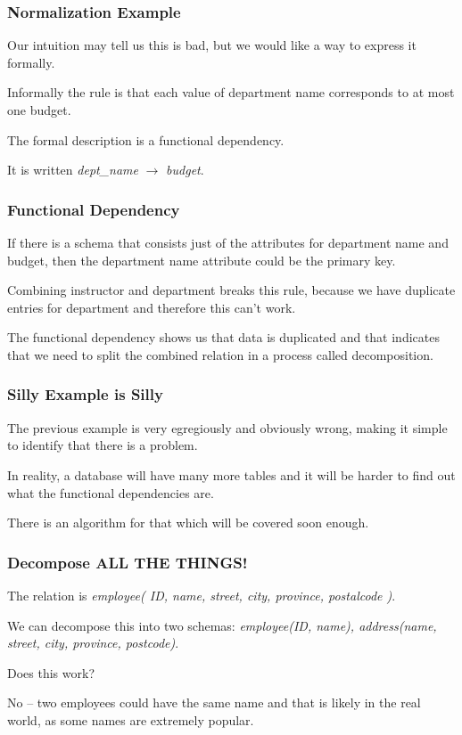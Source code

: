 \begin{frame}
\frametitle{Normalization Example}

Our intuition may tell us this is bad, but we would like a way to express it formally. 

Informally the rule is that each value of department name corresponds to at most one budget. 

The formal description is a \alert{functional dependency}. 

It is written \textit{dept\_name} $\rightarrow$ \textit{budget}. 


\end{frame}



\begin{frame}
\frametitle{Functional Dependency}

If there is a schema that consists just of the attributes for department name and budget, then the department name attribute could be the primary key.

Combining instructor and department breaks this rule, because we have duplicate entries for department and therefore this can't work.

The functional dependency shows us that data is duplicated and that indicates that we need to split the combined relation in a process called \alert{decomposition}.

\end{frame}



\begin{frame}
\frametitle{Silly Example is Silly}

The previous example is very egregiously and obviously wrong, making it simple to identify that there is a problem. 

In reality, a database will have many more tables and it will be harder to find out what the functional dependencies are. 

There is an algorithm for that which will be covered soon enough.
\end{frame}



\begin{frame}
\frametitle{Decompose ALL THE THINGS!}

The relation is \textit{employee( ID, name, street, city, province, postalcode )}.

We can decompose this into two schemas: \textit{employee(ID, name), address(name, street, city, province, postcode)}. 

Does this work? 

No -- two employees could have the same name and that is likely in the real world, as some names are extremely popular. 

\end{frame}



